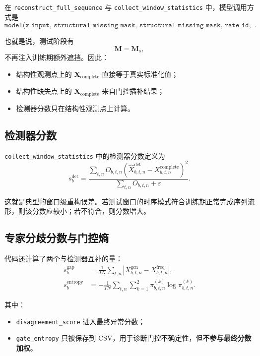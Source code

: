 \documentclass[UTF8]{ctexart}
\begin{document}
在 \texttt{reconstruct\_full\_sequence} 与 \texttt{collect\_window\_statistics} 中，模型调用方式是
\begin{equation}
    \texttt{model(x\_input, structural\_missing\_mask, structural\_missing\_mask, rate\_id, stride)}.
\end{equation}

也就是说，测试阶段有
\begin{equation}
    \bm{M} = \bm{M}_s,
\end{equation}
不再注入训练期额外遮挡。因此：
\begin{itemize}
    \item 结构性观测点上的 \(\bm{X}_{\text{complete}}\) 直接等于真实标准化值；
    \item 结构性缺失点上的 \(\bm{X}_{\text{complete}}\) 来自门控插补结果；
    \item 检测器分数只在结构性观测点上计算。
\end{itemize}

\subsection{检测器分数}

\texttt{collect\_window\_statistics} 中的检测器分数定义为
\begin{equation}
    s^{\text{det}}_b
    =
    \frac{
        \sum_{t,n}
        O_{b,t,n}
        \left(
            \widehat{X}^{\text{det}}_{b,t,n}
            -
            X^{\text{complete}}_{b,t,n}
        \right)^2
    }{
        \sum_{t,n} O_{b,t,n} + \varepsilon
    }.
\end{equation}

这就是典型的窗口级重构误差。若测试窗口的时序模式符合训练期正常完成序列流形，则该分数应较小；若不符合，则分数增大。

\subsection{专家分歧分数与门控熵}

代码还计算了两个与检测器互补的量：
\begin{align}
    s^{\text{gap}}_b
    &= \frac{1}{TN}\sum_{t,n}\left|X^{\text{gcn}}_{b,t,n} - X^{\text{freq}}_{b,t,n}\right|, \\
    s^{\text{entropy}}_b
    &= -\frac{1}{TN}\sum_{t,n}\sum_{k=1}^{2}\pi^{(k)}_{b,t,n}\log \pi^{(k)}_{b,t,n}.
\end{align}

其中：
\begin{itemize}
    \item \texttt{disagreement\_score} 进入最终异常分数；
    \item \texttt{gate\_entropy} 只被保存到 CSV，用于诊断门控不确定性，但\textbf{不参与最终分数加权}。
\end{itemize}
\end{document}
